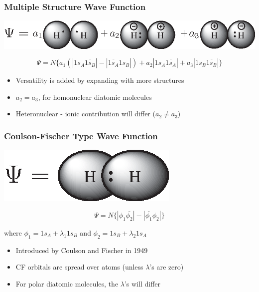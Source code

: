 \documentclass[]{beamer}
\begin{document}
\begin{frame}
  \frametitle{Multiple Structure Wave Function}
  \begin{center}
    \includegraphics[scale=0.95]{figures/heitlerplus.eps}
  \end{center}
  \begin{equation*}
    \Psi= N \{ a_1(|1s_{A}\overline{1s_{B}}| - |\overline{1s_{A}}1s_{B}|) + a_2 |1s_{A}\overline{1s_{A}}| + a_3 |1s_{B}\overline{1s_{B}}| \}
  \end{equation*}
  \begin{itemize}
  \item<1-> Versatility is added by expanding with more structures
  \item<2-> $a_2 = a_3$, for homonuclear diatomic molecules
  \item<3-> Heteronuclear - ionic contribution will differ ($a_2 \neq a_3$)
  \end{itemize}
\end{frame}

\begin{frame}
  \frametitle{Coulson-Fischer Type Wave Function}
  \begin{center}  
    \includegraphics{figures/coulson.eps}
  \end{center}
  \begin{equation*}
    \Psi = N \{ | \phi_1 \overline{\phi_2} | - | \overline{\phi_1} \phi_2 | \}
  \end{equation*}
  \begin{center}
    where $\phi_1 = 1s_A + \lambda_1 1s_B$ and $\phi_2 = 1s_B + \lambda_2 1s_A$
  \end{center}  
  \begin{itemize}
    \item<1-> Introduced by Coulson and Fischer in 1949
    \item<2-> CF orbitals are spread over atoms (unless $\lambda$'s are zero)
    \item<3-> For polar diatomic molecules, the $\lambda$'s will differ
  \end{itemize}
\end{frame}
\end{document}
